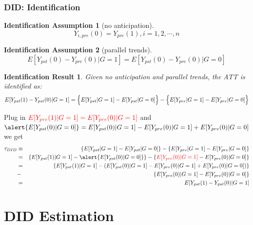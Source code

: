 \documentclass[xcolor=svgnames,9pt,english, aspectratio=169]{beamer}
\newcommand{\red}{\textcolor{red}}
\newtheorem{iass}{Identification Assumption}
\newtheorem{ires}{Identification Result}
\begin{document}
\begin{frame}
  \frametitle{DID: Identification}
\begin{iass}[no anticipation]\small
    $$Y_{i,pre}(0) = Y_{pre}(1), i = 1, 2, \cdots, n$$
\end{iass}  
\begin{iass}[parallel trends]\small
$$E[Y_{pst}(0)-Y_{pre}(0)|G=1]=E[Y_{pst}(0)-Y_{pre}(0)|G=0]$$
\end{iass}
\begin{overprint}
\begin{ires}\small
Given no anticipation and parallel trends, the ATT is identified as:
\begin{equation*}
E[Y_{pst}(1)-Y_{pst}(0)|G=1]=\Bigl\{ E[Y_{pst}|G=1]-E[Y_{pst}|G=0] \Bigr\} -\Bigl\{ E[Y_{pre}|G=1]-E[Y_{pre}|G=0] \Bigr\}
\end{equation*}
\end{ires}
\scriptsize\vspace{-0.5cm}
\begin{Proof}
Plug in $\red{E[Y_{pre}(1)|G=1] = E[Y_{pre}(0)|G=1]}$ and $\alert{E[Y_{pst}(0)|G=0]} = E[Y_{pst}(0)|G=1] - E[Y_{pre}(0)|G=1] + E[Y_{pre}(0)|G=0]$\\
we get
\begin{eqnarray*}
  \tau_{DID} & \equiv & \left\{ E[Y_{pst}|G=1]-E[Y_{pst}|G=0] \right\}
      -\left\{ E[Y_{pre}|G=1]-E[Y_{pre}|G=0] \right\}\\
   &=&  \left\{ E[Y_{pst}(1)|G=1]-\alert{E[Y_{pst}(0)|G=0]} \right\}
      -\left\{ \red{E[Y_{pre}(0)|G=1]}-E[Y_{pre}(0)|G=0] \right\} \\    
&=& \left\{ E[Y_{pst}(1)|G=1]- \left( E[Y_{pst}(0)|G=1] - E[Y_{pre}(0)|G=1] + E[Y_{pre}(0)|G=0] \right) \right\} \\
&-& \left\{ E[Y_{pre}(0)|G=1]-E[Y_{pre}(0)|G=0] \right\}\\
&=&E[Y_{pst}(1)-Y_{pst}(0)|G=1]
\end{eqnarray*}
\end{Proof}
\end{overprint}
\end{frame}


\section{DID Estimation}
\end{document}
